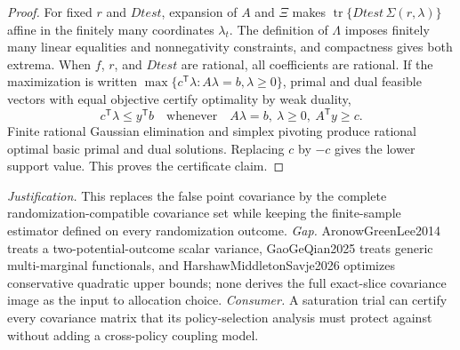\documentclass{article}
\begin{document}
\begin{proof}
For fixed \(r\) and \(Dtest\), expansion of \(A\) and \(\Xi\) makes \(\operatorname{tr}\{Dtest\,\Sigma(r,\lambda)\}\) affine in the finitely many coordinates \(\lambda_t\). The definition of \(\Lambda\) imposes finitely many linear equalities and nonnegativity constraints, and compactness gives both extrema. When \(f\), \(r\), and \(Dtest\) are rational, all coefficients are rational. If the maximization is written \(\max\{c^{\mathsf T}\lambda:A\lambda=b,\lambda\ge0\}\), primal and dual feasible vectors with equal objective certify optimality by weak duality,
\[
c^{\mathsf T}\lambda\le y^{\mathsf T}b\quad\text{whenever}\quad A\lambda=b,\ \lambda\ge0,\ A^{\mathsf T}y\ge c.
\]
Finite rational Gaussian elimination and simplex pivoting produce rational optimal basic primal and dual solutions. Replacing \(c\) by \(-c\) gives the lower support value. This proves the certificate claim.
\end{proof}
\par\smallskip\noindent \textit{Justification.} This replaces the false point covariance by the complete randomization-compatible covariance set while keeping the finite-sample estimator defined on every randomization outcome. \textit{Gap.} AronowGreenLee2014 treats a two-potential-outcome scalar variance, GaoGeQian2025 treats generic multi-marginal functionals, and HarshawMiddletonSavje2026 optimizes conservative quadratic upper bounds; none derives the full exact-slice covariance image as the input to allocation choice. \textit{Consumer.} A saturation trial can certify every covariance matrix that its policy-selection analysis must protect against without adding a cross-policy coupling model.
\end{document}
